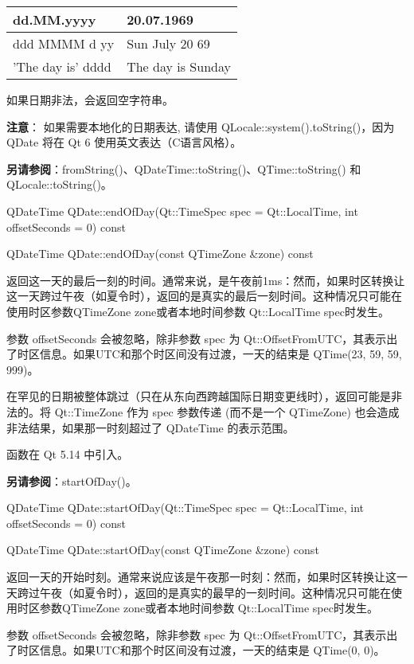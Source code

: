 \begin{tabular}{|l|l|}
\hline
dd.MM.yyyy	&20.07.1969\\
\hline
ddd MMMM d yy&	Sun July 20 69\\
\hline
'The day is' dddd&	The day is Sunday\\
\hline
\end{tabular}

如果日期非法，会返回空字符串。

\textbf{注意}： 如果需要本地化的日期表达, 请使用 QLocale::system().toString()，因为 QDate 将在 Qt 6 使用英文表达（C语言风格）。

\textbf{另请参阅}：fromString()、QDateTime::toString()、QTime::toString() 和
QLocale::toString()。

\splitLine

QDateTime QDate::endOfDay(Qt::TimeSpec spec = Qt::LocalTime, int offsetSeconds = 0) const

QDateTime QDate::endOfDay(const QTimeZone \&zone) const

返回这一天的最后一刻的时间。通常来说，是午夜前1ms：然而，如果时区转换让这一天跨过午夜（如夏令时），返回的是真实的最后一刻时间。这种情况只可能在使用时区参数QTimeZone zone或者本地时间参数 Qt::LocalTime spec时发生。

参数 offsetSeconds 会被忽略，除非参数 spec 为 Qt::OffsetFromUTC，其表示出了时区信息。如果UTC和那个时区间没有过渡，一天的结束是 QTime(23, 59, 59, 999)。

在罕见的日期被整体跳过（只在从东向西跨越国际日期变更线时），返回可能是非法的。将 Qt::TimeZone 作为 spec 参数传递 (而不是一个 QTimeZone) 也会造成非法结果，如果那一时刻超过了 QDateTime 的表示范围。

函数在 Qt 5.14 中引入。

\textbf{另请参阅}：startOfDay()。

\splitLine

QDateTime QDate::startOfDay(Qt::TimeSpec spec = Qt::LocalTime, int offsetSeconds = 0) const

QDateTime QDate::startOfDay(const QTimeZone \&zone) const

返回一天的开始时刻。通常来说应该是午夜那一时刻：然而，如果时区转换让这一天跨过午夜（如夏令时），返回的是真实的最早的一刻时间。这种情况只可能在使用时区参数QTimeZone zone或者本地时间参数 Qt::LocalTime spec时发生。

参数 offsetSeconds 会被忽略，除非参数 spec 为 Qt::OffsetFromUTC，其表示出了时区信息。如果UTC和那个时区间没有过渡，一天的结束是 QTime(0, 0)。

